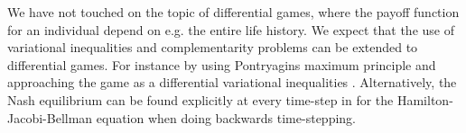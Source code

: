 We have not touched on the topic of differential games, where the payoff function for an individual depend on e.g. the entire life history. We expect that the use of variational inequalities and complementarity problems can be extended to differential games. For instance by using Pontryagins maximum principle and approaching the game as a differential variational inequalities \citep{pang2008differential}. Alternatively, the Nash equilibrium can be found explicitly at every time-step in for the Hamilton-Jacobi-Bellman equation when doing backwards time-stepping.













